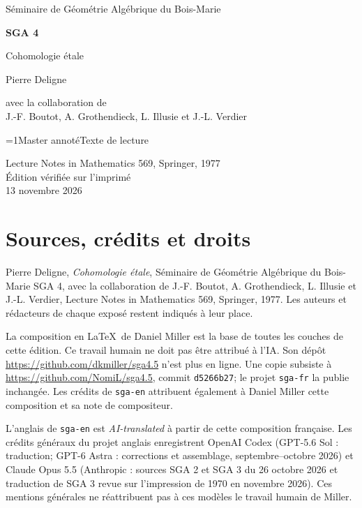 \documentclass[oneside]{book}
\theoremstyle{sga-source}
\theoremstyle{sga-source-dash}
\theoremstyle{sga-source-dotdash}
\theoremstyle{sga-source-number-note-dash}
\theoremstyle{sga-source-note-number-dotdash}
\theoremstyle{sga-source-example-dotdash}
\theoremstyle{sga-source-inline-number}
\theoremstyle{sga-source-bare-number}
\theoremstyle{sga-source}
\providecommand\EditionIsMaster{1}
\begin{document}
\begin{titlepage}
\centering
\vspace*{2cm}
{\Large Séminaire de Géométrie Algébrique du Bois-Marie\par}
\vspace{0.7cm}
{\Huge\bfseries SGA 4\textonehalf\par}
\vspace{0.8cm}
{\huge Cohomologie étale\par}
\vspace{1cm}
{\Large Pierre Deligne\par}
\vspace{0.5cm}
avec la collaboration de\\[0.3em]
J.-F. Boutot, A. Grothendieck, L. Illusie et J.-L. Verdier
\vfill
{\Large \ifnum\EditionIsMaster=1\relax Master annoté\else Texte de lecture\fi\par}
\vspace{0.7cm}
Lecture Notes in Mathematics 569, Springer, 1977\\[0.4em]
Édition vérifiée sur l’imprimé\\
13 novembre 2026
\end{titlepage}

\chapter*{Sources, crédits et droits}
Pierre Deligne, \emph{Cohomologie étale}, Séminaire de Géométrie Algébrique
du Bois-Marie SGA 4\textonehalf, avec la collaboration de J.-F. Boutot,
A. Grothendieck, L. Illusie et J.-L. Verdier, Lecture Notes in Mathematics
569, Springer, 1977. Les auteurs et rédacteurs de chaque exposé restent
indiqués à leur place.

\medskip
La composition en \LaTeX\ de Daniel Miller est la base de toutes les couches
de cette édition. Ce travail humain ne doit pas être attribué à l’IA.
Son dépôt \url{https://github.com/dkmiller/sga4.5} n’est plus en ligne.
Une copie subsiste à \url{https://github.com/NomiL/sga4.5}, commit
\texttt{d5266b27}; le projet \texttt{sga-fr} la publie inchangée.
Les crédits de \texttt{sga-en} attribuent également à Daniel Miller cette
composition et sa note de compositeur.

\medskip
L’anglais de \texttt{sga-en} est \emph{AI-translated} à partir de cette
composition française. Les crédits généraux du projet anglais enregistrent
OpenAI Codex (GPT-5.6 Sol : traduction; GPT-6 Astra : corrections et
assemblage, septembre--octobre 2026) et Claude Opus 5.5 (Anthropic : sources
SGA 2 et SGA 3 du 26 octobre 2026 et traduction de SGA 3 revue sur
l’impression de 1970 en novembre 2026). Ces mentions générales ne
réattribuent pas à ces modèles le travail humain de Miller.
\end{document}
